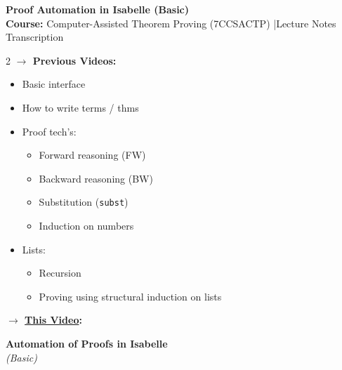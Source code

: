 \documentclass[9pt,a4paper]{extarticle}
\begin{document}
\begin{center}
    {\LARGE \textbf{Proof Automation in Isabelle (Basic)}}\\[0.1em]
    {\small \textbf{Course:} Computer-Assisted Theorem Proving (7CCSACTP) \quad|\quad Lecture Notes Transcription}
\end{center}

\vspace{-0.6em}

\begin{tcolorbox}[title=Context \& Agenda, colframe=isabelleblue!85!black]
\begin{multicols}{2}
\textbf{$\rightarrow$ Previous Videos:}
\begin{itemize}[leftmargin=1.1em, itemsep=0pt]
    \item Basic interface
    \item How to write terms / thms
    \item Proof tech's:
    \begin{itemize}[leftmargin=0.9em, label=$\rightarrow$, itemsep=0pt]
        \item Forward reasoning (FW)
        \item Backward reasoning (BW)
        \item Substitution (\texttt{subst})
        \item Induction on numbers
    \end{itemize}
    \item Lists:
    \begin{itemize}[leftmargin=0.9em, label=$\rightarrow$, itemsep=0pt]
        \item Recursion
        \item Proving using structural induction on lists
    \end{itemize}
\end{itemize}

\columnbreak

\textbf{$\rightarrow$ \underline{This Video}:}
\begin{center}
    \vspace{0.4em}
    {\large \textbf{Automation of Proofs in Isabelle}} \\
    \textit{(Basic)}
\end{center}
\end{multicols}
\end{tcolorbox}

\vspace{-0.4em}
\end{document}
